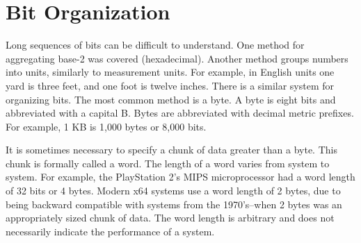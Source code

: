 \begin{figure}[h]
\end{figure}

\section{Bit Organization\label{sec:data:bits}}

Long sequences of bits can be difficult to understand. One method for aggregating \gls{base-2} was covered (hexadecimal). 
Another method groups numbers into units, similarly to measurement units. For example, in English units one yard is 
three feet, and one foot is twelve inches. There is a similar system for organizing bits. The most common method is 
a byte. A byte is eight bits and abbreviated with a capital B. Bytes are abbreviated with decimal metric prefixes. For 
example, 1 KB is 1,000 bytes or 8,000 bits.

It is sometimes necessary to specify a chunk of data greater than a byte. This chunk is formally called a word. The 
length of a word varies from system to system. For example, the PlayStation 2's MIPS microprocessor had a word length of 
32 bits or 4 bytes. Modern \gls{x64} systems use a word length of 2 bytes, due to being backward compatible with systems 
from the 1970's--when 2 bytes was an appropriately sized chunk of data. The word length is arbitrary and does not necessarily
indicate the performance of a system.